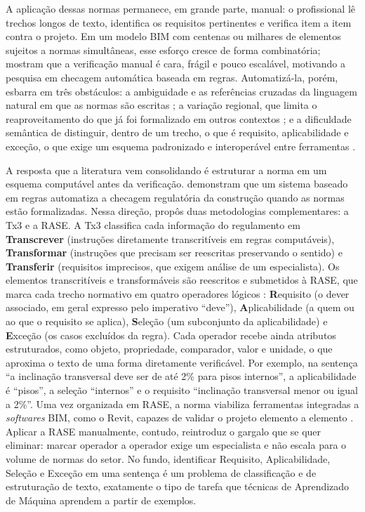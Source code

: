 \documentclass[a4paper,fleqn]{cas-sc}
\begin{document}
A aplicação dessas normas permanece, em grande parte, manual: o profissional lê trechos longos de texto, identifica os requisitos pertinentes e verifica item a item contra o projeto. Em um modelo BIM com centenas ou milhares de elementos sujeitos a normas simultâneas, esse esforço cresce de forma combinatória; \citet{eastman2009} mostram que a verificação manual é cara, frágil e pouco escalável, motivando a pesquisa em checagem automática baseada em regras. Automatizá-la, porém, esbarra em três obstáculos: a ambiguidade e as referências cruzadas da linguagem natural em que as normas são escritas \citep{dimyadi2013}; a variação regional, que limita o reaproveitamento do que já foi formalizado em outros contextos \citep{dimyadi2013,solihin2015}; e a dificuldade semântica de distinguir, dentro de um trecho, o que é requisito, aplicabilidade e exceção, o que exige um esquema padronizado e interoperável entre ferramentas \citep{solihin2015}.

A resposta que a literatura vem consolidando é estruturar a norma em um esquema computável antes da verificação. \citet{beach2015} demonstram que um sistema baseado em regras automatiza a checagem regulatória da construção quando as normas estão formalizadas. Nessa direção, \citet{hjelseth2015} propôs duas metodologias complementares: a Tx3 e a RASE. A Tx3 classifica cada informação do regulamento em \textbf{Transcrever} (instruções diretamente transcritíveis em regras computáveis), \textbf{Transformar} (instruções que precisam ser reescritas preservando o sentido) e \textbf{Transferir} (requisitos imprecisos, que exigem análise de um especialista). Os elementos transcritíveis e transformáveis são reescritos e submetidos à RASE, que marca cada trecho normativo em quatro operadores lógicos \citep{hjelseth2011}: \textbf{R}equisito (o dever associado, em geral expresso pelo imperativo ``deve''), \textbf{A}plicabilidade (a quem ou ao que o requisito se aplica), \textbf{S}eleção (um subconjunto da aplicabilidade) e \textbf{E}xceção (os casos excluídos da regra). Cada operador recebe ainda atributos estruturados, como objeto, propriedade, comparador, valor e unidade, o que aproxima o texto de uma forma diretamente verificável. Por exemplo, na sentença ``a inclinação transversal deve ser de até 2\% para pisos internos'', a aplicabilidade é ``pisos'', a seleção ``internos'' e o requisito ``inclinação transversal menor ou igual a 2\%''. Uma vez organizada em RASE, a norma viabiliza ferramentas integradas a \textit{softwares} BIM, como o Revit, capazes de validar o projeto elemento a elemento \citep{santos2021}. Aplicar a RASE manualmente, contudo, reintroduz o gargalo que se quer eliminar: marcar operador a operador exige um especialista e não escala para o volume de normas do setor. No fundo, identificar Requisito, Aplicabilidade, Seleção e Exceção em uma sentença é um problema de classificação e de estruturação de texto, exatamente o tipo de tarefa que técnicas de Aprendizado de Máquina aprendem a partir de exemplos.
\end{document}
